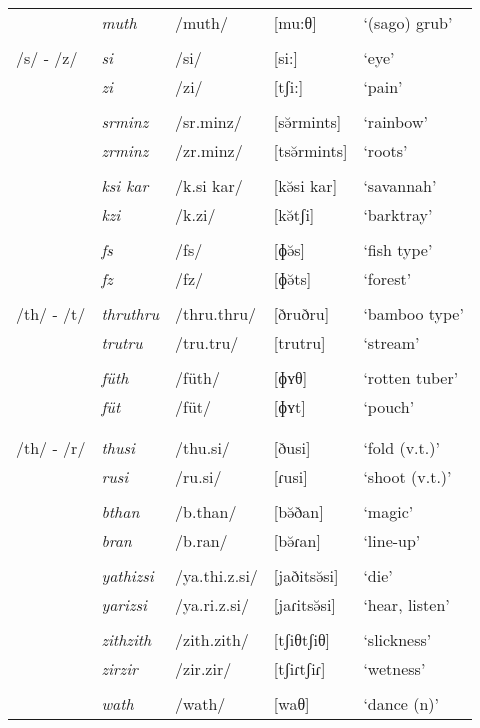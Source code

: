 \begin{table}
\begin{tabularx}{\textwidth}{lllll}
		& \emph{muth} & /muth/ & [mu:θ] & `(sago) grub'\\
		&&&&\\
		/s/ - /z/ & \emph{si} & /si/ & [si:] & `eye'\\
		& \emph{zi} & /zi/ & [tʃi:] & `pain'\\
		&&&&\\
		& \emph{srminz} & /sr.minz/ & [sə̆rmints] & `rainbow'\\
		& \emph{zrminz} & /zr.minz/ & [tsə̆rmints] & `roots'\\
		&&&&\\
		& \emph{ksi kar} & /k.si kar/ & [kə̆si kar] & `savannah'\\
		& \emph{kzi} & /k.zi/ & [kə̆tʃi] & `barktray'\\
		&&&&\\
		& \emph{fs} & /fs/ & [ɸə̆s] & `fish type'\\
		& \emph{fz} & /fz/ & [ɸə̆ts] & `forest'\\
		&&&&\\
		/th/ - /t/ & \emph{thruthru} & /thru.thru/ & [ðruðru] & `bamboo type'\\
		& \emph{trutru} & /tru.tru/ & [trutru] & `stream'\\
		&&&&\\
		& \emph{füth} & /füth/ & [ɸʏθ] & `rotten tuber'\\
		& \emph{füt} & /füt/ & [ɸʏt] & `pouch'\\
		&&&&\\
		&&&&\\
		/th/ - /r/ & \emph{thusi} & /thu.si/ & [ðusi] & `fold (v.t.)'\\
		& \emph{rusi} & /ru.si/ & [ɾusi] & `shoot (v.t.)'\\
		&&&&\\
		& \emph{bthan} & /b.than/ & [\super{m}bə̆ðan] & `magic'\\
		& \emph{bran} & /b.ran/ & [\super{m}bə̆ɾan] & `line-up'\\
		&&&&\\
		& \emph{yathizsi} & /ya.thi.z.si/ & [jaðitsə̆si] & `die'\\
		& \emph{yarizsi} & /ya.ri.z.si/ & [jaɾitsə̆si] & `hear, listen'\\
		&&&&\\
		& \emph{zithzith} & /zith.zith/ & [tʃiθtʃiθ]& `slickness'\\
		& \emph{zirzir} & /zir.zir/ & [tʃiɾtʃiɾ]& `wetness'\\
		&&&&\\
		& \emph{wath} & /wath/ & [waθ] & `dance (n)'\\

\end{tabularx}
\end{table}
